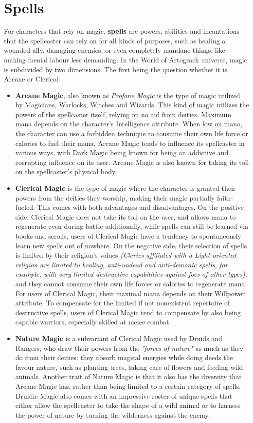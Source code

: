 \section{Spells}
For characters that rely on magic, \textbf{spells} are powers, abilities and incantations that the spellcaster can rely on for all kinds of purposes, such as healing a wounded ally, damaging enemies, or even completely mundane things, like making menial labour less demanding. In the World of Artograch universe, magic is subdivided by two dimensions. The first being the question whether it is Arcane or Clerical:
\begin{itemize}
\item \textbf{Arcane Magic}, also known as \textit{Profane Magic} is the type of magic utilized by Magicians, Warlocks, Witches and Wizards. This kind of magic utilizes the powers of the spellcaster itself, relying on no aid from deities. Maximum mana depends on the character's Intelligence attribute. When low on mana, the character can use a forbidden technique to consume their own life force or calories to fuel their mana. Arcane Magic tends to influence its spellcaster in various ways, with Dark Magic being known for being an addictive and corrupting influence on its user. Arcane Magic is also known for taking its toll on the spellcaster's physical body.
\item \textbf{Clerical Magic} is the type of magic where the character is granted their powers from the deities they worship, making their magic partially faith-fueled. This comes with both advantages and disadvantages. On the positive side, Clerical Magic does not take its toll on the user, and allows mana to regenerate even during battle \textemdash additionally, while spells can still be learned via books and scrolls, users of Clerical Magic have a tendency to spontaneously learn new spells out of nowhere. On the negative side, their selection of spells is limited by their religion's values \textit{(Clerics affiliated with a Light-oriented religion are limited to healing, anti-undead and anti-demonic spells, for example, with very limited destructive capabilities against foes of other types)}, and they cannot consume their own life forces or calories to regenerate mana. For users of Clerical Magic, their maximal mana depends on their Willpower attribute. To compensate for the limited \textemdash if not nonexistent \textemdash repertoire of destructive spells, users of Clerical Magic tend to compensate by also being capable warriors, especially skilled at melee combat. 
\item \textbf{Nature Magic} is a subvariant of Clerical Magic used by Druids and Rangers, who draw their powers from the \textit{"forces of nature"} as much as they do from their deities: they absorb magical energies while doing deeds the favour nature, such as planting trees, taking care of flowers and feeding wild animals. Another trait of Nature Magic is that it also has the diversity that Arcane Magic has, rather than being limited to a certain category of spells. Druidic Magic also comes with an impressive roster of unique spells that either allow the spellcaster to take the shape of a wild animal or to harness the power of nature by turning the wilderness against the enemy.
\end{itemize}

